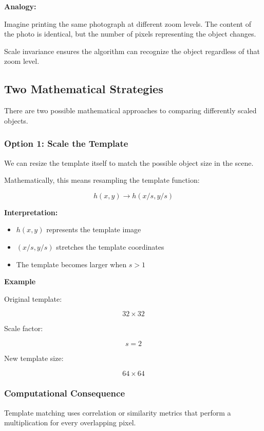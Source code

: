 \documentclass[12pt]{article}
\begin{document}
\textbf{Analogy:}

Imagine printing the same photograph at different zoom levels. The content of the photo is identical, but the number of pixels representing the object changes.

Scale invariance ensures the algorithm can recognize the object regardless of that zoom level.

\subsection{Two Mathematical Strategies}

There are two possible mathematical approaches to comparing differently scaled objects.

\subsubsection{Option 1: Scale the Template}

We can resize the template itself to match the possible object size in the scene.

Mathematically, this means resampling the template function:

\[
    h(x,y) \rightarrow h(x/s, y/s)
\]

\textbf{Interpretation:}

\begin{itemize}
    \item $h(x,y)$ represents the template image
    \item $(x/s, y/s)$ stretches the template coordinates
    \item The template becomes larger when $s > 1$
\end{itemize}

\textbf{Example}

Original template:

\[
    32 \times 32
\]

Scale factor:

\[
    s = 2
\]

New template size:

\[
    64 \times 64
\]

\subsubsection{Computational Consequence}

Template matching uses correlation or similarity metrics that perform a multiplication for every overlapping pixel.
\end{document}
